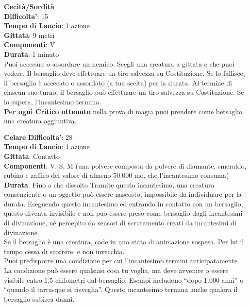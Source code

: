 \begin{multicols}{2}
\medskip\textbf{Cecità/Sordità}\\
\textbf{Difficolta'}: 15\\
\textbf{Tempo di Lancio}: 1 azione\\
\textbf{Gittata}: 9 metri\\
\textbf{Componenti}: V\\
\textbf{Durata}: 1 minuto\\
Puoi accecare o assordare un nemico. Scegli una creatura a gittata e che puoi vedere. Il bersaglio deve effettuare un tiro salvezza su Costituzione. Se lo fallisce, il bersaglio è accecato o assordato (a tua scelta) per la durata. Al termine di ciascun suo turno, il bersaglio può effettuare un tiro salvezza su Costituzione. Se lo supera, l’incantesimo termina.\\
\textbf{Per ogni Critico ottenuto} nella prova di magia puoi prendere come bersaglio una creatura aggiuntiva.

\medskip\textbf{Celare}
\textbf{Difficolta'}: 28\\
\textbf{Tempo di Lancio}: 1 azione\\
\textbf{Gittata}: Contatto\\
\textbf{Componenti}: V, S, M (una polvere composta da polvere di diamante, smeraldo, rubino e zaffiro del valore di almeno 50.000 mo, che l’incantesimo consuma)\\
\textbf{Durata}: Fino a che dissolto Tramite questo incantesimo, una creatura consenziente o un oggetto può essere nascosto, impossibile da individuare per la durata. Eseguendo questo incantesimo ed entrando in contatto con un bersaglio, questo diventa invisibile e non può essere preso come bersaglio dagli incantesimi di divinazione, né percepito da sensori di scrutamento creati da incantesimi di divinazione.\\
Se il bersaglio è una creatura, cade in uno stato di animazione sospesa. Per lui il tempo cessa di scorrere, e non invecchia. \\
Puoi predisporre una condizione per cui l’incantesimo termini anticipatamente. La condizione può essere qualsiasi cosa tu voglia, ma deve avvenire o essere visibile entro 1,5 chilometri dal bersaglio. Esempi includono “dopo 1.000 anni” o “quando il tarrasque si risveglia”. Questo incantesimo termina anche qualora il bersaglio subisca danni.



\end{multicols}
